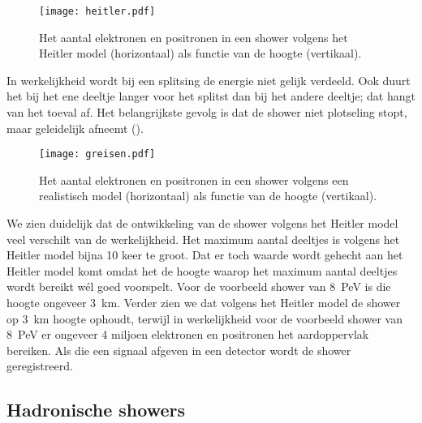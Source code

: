 \begin{figure}
    \centering
    \texttt{[image: heitler.pdf]}
    \caption{Het aantal elektronen en positronen in een shower volgens het Heitler model (horizontaal) als functie van de hoogte (vertikaal).}
    \label{fig:heitler}
\end{figure}

In werkelijkheid wordt bij een splitsing de energie niet gelijk
verdeeld. Ook duurt het bij het ene deeltje langer voor het splitst dan
bij het andere deeltje; dat hangt van het toeval af. Het belangrijkste
gevolg is dat de shower niet plotseling stopt, maar geleidelijk afneemt
().

\begin{figure}
    \centering
    \texttt{[image: greisen.pdf]}
    \caption{Het aantal elektronen en positronen in een shower volgens een realistisch model (horizontaal) als functie van de hoogte (vertikaal).}
    \label{fig:greisen}
\end{figure}

We zien duidelijk dat de ontwikkeling van de shower volgens het Heitler
model veel verschilt van de werkelijkheid. Het maximum aantal deeltjes
is volgens het Heitler model bijna 10 keer te groot. Dat er toch waarde
wordt gehecht aan het Heitler model komt omdat het de hoogte waarop het
maximum aantal deeltjes wordt bereikt wél goed voorspelt. Voor de
voorbeeld shower van \SI{8}{\peta\electronvolt} is die hoogte ongeveer
\SI{3}{\km}. Verder zien we dat volgens het Heitler model de shower op
\SI{3}{\km} hoogte ophoudt, terwijl in werkelijkheid voor de voorbeeld
shower van \SI{8}{\peta\electronvolt} er ongeveer 4 miljoen elektronen
en positronen het aardoppervlak bereiken. Als die een signaal afgeven in
een \hisparc detector wordt de shower geregistreerd.  

\subsection{Hadronische showers}

